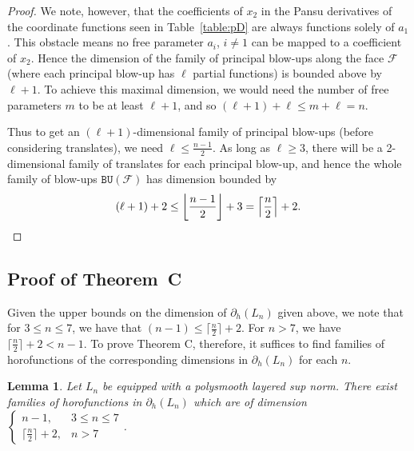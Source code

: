 \documentclass{article}
\newtheorem{lemma}[theorem]{Lemma}
\theoremstyle{definition}
\newcommand{\BU}{\mathtt{BU}}
\newcommand{\bhor}{\partial_h}
\newcommand{\cF}{{\mathcal F}}
\begin{document}
\begin{proof}
We note, however, that the coefficients of $x_2$ in the Pansu derivatives of the coordinate functions seen in Table~\ref{table:pD} are always functions solely of $a_1$. This obstacle means no free parameter $a_i$, $i\neq 1$ can be mapped to a coefficient of $x_2$. Hence the dimension of the family of principal blow-ups along the face $\cF$ (where each principal blow-up has $\ell$ partial functions) is bounded above by $\ell+1$. To achieve this maximal dimension, we would need the number of free parameters $m$ to be at least $\ell + 1$, and so $(\ell + 1) + \ell \leq m + \ell = n$.

Thus to get an $(\ell+1)$-dimensional family of principal blow-ups (before considering translates), we need $\ell \leq \frac{n-1}{2}$. As long as $\ell \geq 3$, there will be a 2-dimensional family of translates for each principal blow-up, and hence the whole family of blow-ups $\BU(\cF)$ has dimension bounded by 
\[
(\ell + 1) + 2 \leq \left\lfloor\frac{n-1}{2}\right\rfloor + 3 = \left\lceil \frac{n}2\right\rceil + 2. \qedhere
\]
\end{proof}

\subsection{Proof of Theorem~C}\label{sec-thmC}

Given the upper bounds on the dimension of $\bhor(L_n)$ given above, we note that for $3 \leq n \leq 7$, we have that $(n-1) \leq \lceil\frac{ n }{2}\rceil + 2$. For $n > 7$, we have $\lceil\frac{ n }{2}\rceil + 2 < n-1$. To prove Theorem C, therefore, it suffices to find families of horofunctions of the corresponding dimensions in $\bhor(L_n)$ for each $n$.

\begin{lemma}\label{lem:fill}
Let $L_n$ be equipped with a polysmooth layered sup norm. There exist families of horofunctions in $\bhor(L_n)$ which are of dimension $\begin{cases}
n-1, & 3\leq n \leq 7\\
\lceil\frac{ n }{2}\rceil + 2, & n>7
\end{cases}$.
\end{lemma}
\end{document}
